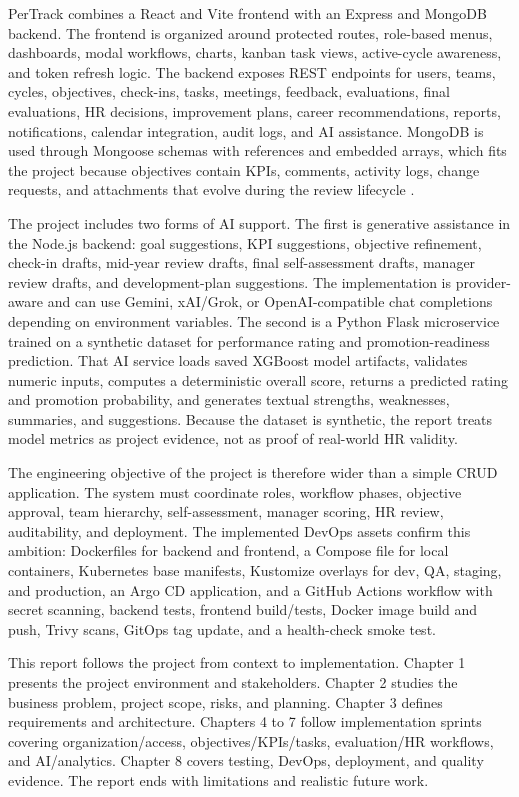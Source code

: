 PerTrack combines a React and Vite frontend with an Express and MongoDB backend. The frontend is organized around protected routes, role-based menus, dashboards, modal workflows, charts, kanban task views, active-cycle awareness, and token refresh logic. The backend exposes REST endpoints for users, teams, cycles, objectives, check-ins, tasks, meetings, feedback, evaluations, final evaluations, HR decisions, improvement plans, career recommendations, reports, notifications, calendar integration, audit logs, and AI assistance. MongoDB is used through Mongoose schemas with references and embedded arrays, which fits the project because objectives contain KPIs, comments, activity logs, change requests, and attachments that evolve during the review lifecycle \cite{mongodbDocs,mongooseSchemas}.

The project includes two forms of AI support. The first is generative assistance in the Node.js backend: goal suggestions, KPI suggestions, objective refinement, check-in drafts, mid-year review drafts, final self-assessment drafts, manager review drafts, and development-plan suggestions. The implementation is provider-aware and can use Gemini, xAI/Grok, or OpenAI-compatible chat completions depending on environment variables. The second is a Python Flask microservice trained on a synthetic dataset for performance rating and promotion-readiness prediction. That AI service loads saved XGBoost model artifacts, validates numeric inputs, computes a deterministic overall score, returns a predicted rating and promotion probability, and generates textual strengths, weaknesses, summaries, and suggestions. Because the dataset is synthetic, the report treats model metrics as project evidence, not as proof of real-world HR validity.

The engineering objective of the project is therefore wider than a simple CRUD application. The system must coordinate roles, workflow phases, objective approval, team hierarchy, self-assessment, manager scoring, HR review, auditability, and deployment. The implemented DevOps assets confirm this ambition: Dockerfiles for backend and frontend, a Compose file for local containers, Kubernetes base manifests, Kustomize overlays for dev, QA, staging, and production, an Argo CD application, and a GitHub Actions workflow with secret scanning, backend tests, frontend build/tests, Docker image build and push, Trivy scans, GitOps tag update, and a health-check smoke test.

This report follows the project from context to implementation. Chapter 1 presents the project environment and stakeholders. Chapter 2 studies the business problem, project scope, risks, and planning. Chapter 3 defines requirements and architecture. Chapters 4 to 7 follow implementation sprints covering organization/access, objectives/KPIs/tasks, evaluation/HR workflows, and AI/analytics. Chapter 8 covers testing, DevOps, deployment, and quality evidence. The report ends with limitations and realistic future work.
